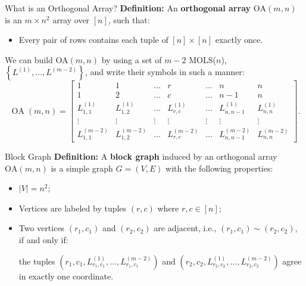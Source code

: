 \documentclass{beamer}
\begin{document}
\begin{frame}{What is an Orthogonal Array?}
  \textbf{Definition:} An \textbf{orthogonal array} \( \text{OA}(m, n) \) is an \( m \times n^2 \) array over \( [n] \), such that:
  \begin{itemize}
    \item Every pair of rows contains each tuple of $[n]\times[n]$ exactly once.
  \end{itemize}

  \vspace{1em}
  We can build OA$(m,n)$ by using a set of $m-2$ MOLS($n$), $\left\{L^{(1)},\dots, L^{(m-2)}\right\}$, and write their symbols in such a manner:
  \begin{equation*}
      \operatorname{OA}(m,n) = \begin{bmatrix}
          1&1&\dots&r&\dots&n&n\\
          1&2&\dots&c&\dots&n-1&n\\
          L_{1,1}^{(1)}&L_{1,2}^{(1)}&\dots&L_{r,c}^{(1)}&\dots&L_{n,n-1}^{(1)}&L_{n,n}^{(1)}\\
          \vdots&\vdots&\vdots&\vdots&\vdots&\vdots&\vdots\\
          L_{1,1}^{(m-2)}&L_{1,2}^{(m-2)}&\dots&L_{r,c}^{(m-2)}&\dots&L_{n,n-1}^{(m-2)}&L_{n,n}^{(m-2)}
      \end{bmatrix}.
  \end{equation*}
\end{frame}

\begin{frame}{Block Graph}
  \textbf{Definition:} A \textbf{block graph} induced by an orthogonal array $\text{OA}(m,n)$ is a simple graph $G=(V,E)$ with the following properties:
  \begin{itemize}
      \item $|V| = n^2$;
      \item Vertices are labeled by tuples $(r, c)$ where $r, c \in [n]$;
      \item Two vertices $(r_1, c_1)$ and $(r_2, c_2)$ are adjacent, i.e., $(r_1, c_1) \sim (r_2, c_2)$, if and only if:
      \vspace{0.5em}
      \begin{center}
        the tuples 
        $\displaystyle \left(r_1, c_1, L^{(1)}_{r_1, c_1}, \dots, L^{(m-2)}_{r_1, c_1} \right)$ and 
        $\displaystyle \left(r_2, c_2, L^{(1)}_{r_2, c_2}, \dots, L^{(m-2)}_{r_2, c_2} \right)$
        agree in exactly one coordinate.
      \end{center}
  \end{itemize}
\end{frame}
\end{document}
